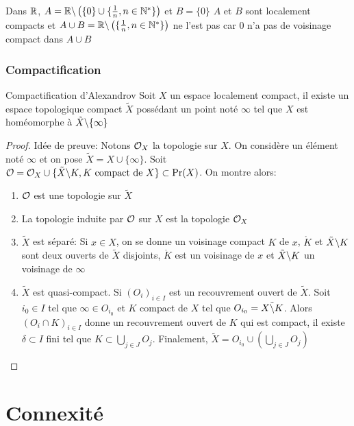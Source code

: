 \documentclass[]{report}
\begin{document}
    \begin{ex}{}{}
        Dans $\mathbb{R}$, $A=\mathbb{R}\backslash\left(\{0\}\cup\{\frac{1}{n},n\in \mathbb{N}^*\}\right)$ et $B=\{0\}$
        $A$ et $B$ sont localement compacts et $A\cup B=\mathbb{R}\backslash\left( \{\frac{1}{n},n\in \mathbb{N}^*\}\right)$ ne l'est pas car $0$ n'a pas de voisinage compact dans $A\cup B$
    \end{ex}

    \subsection*{Compactification}

    \begin{tm}{Compactification d'Alexandrov}{}
        Soit $X$ un espace localement compact, il existe un espace topologique compact $\tilde{X}$ possédant un point noté $\infty$ tel que $X$ est homéomorphe à $\tilde{X}\backslash\{\infty\}$
    \end{tm}

    \begin{proof}
        Idée de preuve: Notons $\mathcal{O}_X$ la topologie sur $X$. On considère un élément noté $\infty$ et on pose $\tilde{X}=X\cup\{\infty\}$. Soit $\mathcal{O}=\mathcal{O}_X\cup \{\tilde{X}\backslash K,K\text{ compact de }X\}\subset \Pr(X)$. On montre alors:
        \begin{enumerate}
            \item $\mathcal{O}$ est une topologie sur $\tilde{X}$
            \item La topologie induite par $\mathcal{O}$ sur $X$ est la topologie $\mathcal{O}_X$
            \item $\tilde{X}$ est séparé: Si $x\in X$, on se donne un voisinage compact $K$ de $x$, $\mathring{K}$ et $\tilde{X}\backslash K$ sont deux ouverts de $\tilde{X}$ disjoints, $\mathring{K}$ est un voisinage de $x$ et $\tilde{X}\backslash K$ un voisinage de $\infty$
            \item $\tilde{X}$ est quasi-compact. Si $(O_i)_{i\in I}$ est un recouvrement ouvert de $\tilde{X}$. Soit $i_0\in I$ tel que $\infty\in O_{i_0}$ et $K$ compact de $X$ tel que $O_{i_0}=\tilde{X\backslash K}$. Alors $(O_i\cap K)_{i\in I}$ donne un recouvrement ouvert de $K$ qui est compact, il existe $\delta\subset I$ fini tel que $K\subset \bigcup_{j\in J}O_j$. Finalement, $\tilde{X}=O_{i_0}\cup(\bigcup_{j\in J}O_j)$
        \end{enumerate}
    \end{proof}

    \chapter{Connexité}
\end{document}
